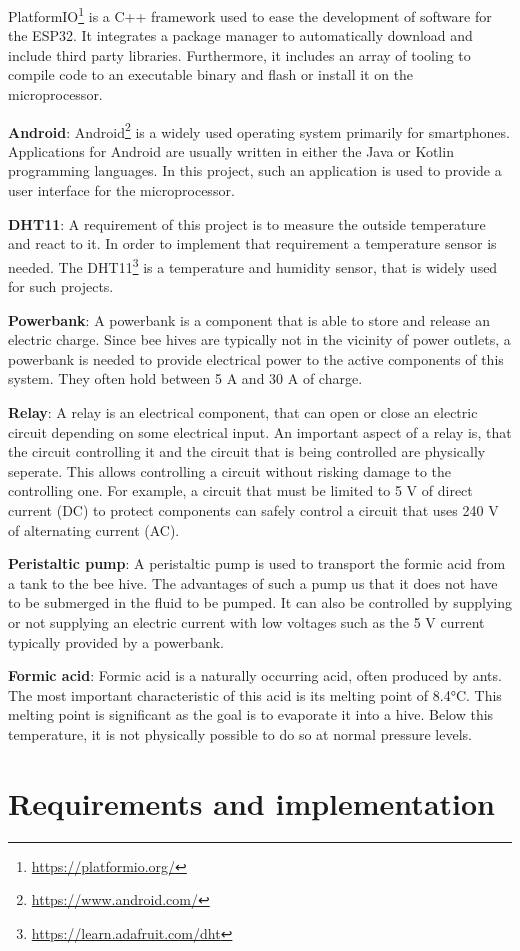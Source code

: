 \documentclass[11pt]{article}
\begin{document}
    PlatformIO\footnote{\url{https://platformio.org/}} is a C++ framework used to ease the development of software for the ESP32.
    It integrates a package manager to automatically download and include third party libraries.
    Furthermore, it includes an array of tooling to compile code to an executable binary and flash or install it on the microprocessor.

    \textbf{Android}: Android\footnote{\url{https://www.android.com/}} is a widely used operating system primarily for smartphones.
    Applications for Android are usually written in either the Java or Kotlin programming languages.
    In this project, such an application is used to provide a user interface for the microprocessor.
    
    \textbf{DHT11}: A requirement of this project is to measure the outside temperature and react to it.
    In order to implement that requirement a temperature sensor is needed.
    The DHT11\footnote{\url{https://learn.adafruit.com/dht}} is a temperature and humidity sensor, that is widely used for such projects.

    \textbf{Powerbank}: A powerbank is a component that is able to store and release an electric charge.
    Since bee hives are typically not in the vicinity of power outlets, a powerbank is needed to provide electrical power to the active components of this system.
    They often hold between 5 A and 30 A of charge.

    \textbf{Relay}: A relay is an electrical component, that can open or close an electric circuit depending on some electrical input.
    An important aspect of a relay is, that the circuit controlling it and the circuit that is being controlled are physically seperate.
    This allows controlling a circuit without risking damage to the controlling one.
    For example, a circuit that must be limited to 5 V of direct current (DC) to protect components can safely control a circuit that uses 240 V of alternating current (AC).

    \textbf{Peristaltic pump}: A peristaltic pump is used to transport the formic acid from a tank to the bee hive.
    The advantages of such a pump us that it does not have to be submerged in the fluid to be pumped.
    It can also be controlled by supplying or not supplying an electric current with low voltages such as the 5 V current typically provided by a powerbank.

    \textbf{Formic acid}: Formic acid is a naturally occurring acid, often produced by ants.
    The most important characteristic of this acid is its melting point of 8.4°C\cite{FormicAcid}.
    This melting point is significant as the goal is to evaporate it into a hive.
    Below this temperature, it is not physically possible to do so at normal pressure levels.

    \section{Requirements and implementation}\label{sec:requirements-and-implementation}



    \newpage
    \printbibliography
\end{document}
